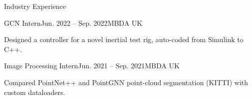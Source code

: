 \begin{rSection}{Industry Experience}
    \begin{rSubsection}{GCN Intern}{Jun. 2022 -- Sep. 2022}{MBDA UK}{}
        \item Designed a controller for a novel inertial test rig, auto-coded from Simulink to C++.
    \end{rSubsection}

    \begin{rSubsection}{Image Processing Intern}{Jun. 2021 -- Sep. 2021}{MBDA UK}{}
        \item Compared PointNet++ and PointGNN point-cloud segmentation (KITTI) with custom dataloaders.
    \end{rSubsection}

\end{rSection}
